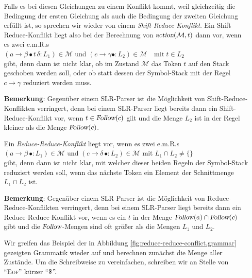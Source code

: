 Falls es bei diesen Gleichungen zu einem Konflikt kommt, weil gleichzeitig die Bedingung
der ersten Gleichung als auch die Bedingung der zweiten Gleichung erf\"ullt ist, so sprechen
wir wieder von einem \emph{Shift-Reduce-Konflikt}.  
Ein Shift-Reduce-Konflikt liegt also bei der Berechnung von
$\textsl{action}(\mathcal{M},t)$ dann vor, wenn es zwei e.m.R.s 
\\[0.2cm]
\hspace*{1.3cm}
$(a \rightarrow \beta \bullet t\, \delta:L_1) \in \mathcal{M}$ \quad \mbox{und} \quad 
$(c \rightarrow \gamma\bullet :L_2) \in \mathcal{M} \quad \mbox{mit}\; t \in L_2$
\\[0.2cm]
gibt, denn dann ist nicht klar, ob im Zustand $\mathcal{M}$ das Token $t$ auf den Stack geschoben werden
soll, oder ob statt dessen der Symbol-Stack mit der Regel $c \rightarrow \gamma$ reduziert werden muss.
\vspace*{0.2cm}

\noindent
\textbf{Bemerkung}:  Gegen\"uber einem SLR-Parser ist die M\"oglichkeit von
Shift-Reduce-Konflikten verringert, denn  bei einem SLR-Parser liegt bereits dann ein
Shift-Reduce-Konflikt vor, wenn $t \in \textsl{Follow}(c)$ gilt und die Menge $L_2$ ist in der Regel kleiner als die
Menge $\textsl{Follow}(c)$.  \eox 
\vspace*{0.3cm}

Ein \emph{Reduce-Reduce-Konflikt} liegt vor, wenn es zwei e.m.R.s 
\\[0.2cm]
\hspace*{1.3cm}
$(a \rightarrow \beta\, \bullet:L_1) \in \mathcal{M}$ \quad \mbox{und} \quad 
$(c \rightarrow \delta\, \bullet:L_2) \in \mathcal{M}$ \quad \mbox{mit} \quad $L_1 \cap L_2 \not= \{\}$
\\[0.2cm]
gibt, denn dann ist nicht klar, mit welcher dieser beiden Regeln der Symbol-Stack reduziert werden soll,
wenn das n\"achste Token ein Element der Schnittmenge $L_1 \cap L_2$ ist.
\vspace*{0.2cm}

\noindent
\textbf{Bemerkung}:  Gegen\"uber einem SLR-Parser ist die M\"oglichkeit von
Reduce-Reduce-Konflikten verringert, denn  bei einem SLR-Parser liegt bereits dann ein
Reduce-Reduce-Konflikt vor, wenn es ein $t$ in der Menge
 $\textsl{Follow}(a) \cap \textsl{Follow}(c)$ gibt und die $\textsl{Follow}$-Mengen sind oft gr\"o{\ss}er als die Mengen
$L_1$ und $L_2$.  \eox
\vspace*{0.3cm}


\example
Wir greifen das Beispiel der in Abbildung \ref{fig:reduce-reduce-conflict.grammar} gezeigten Grammatik
wieder auf und berechnen zun\"achst die Menge aller Zust\"ande.  Um die Schreibweise zu
vereinfachen, schreiben wir an Stelle von ``\textsc{Eof}'' k\"urzer ``$\symbol{36}$''.

